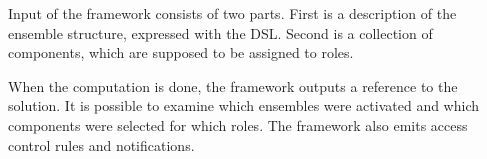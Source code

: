 \medskip

Input of the framework consists of two parts. First is a description of the ensemble
structure, expressed with the DSL. Second is a collection of components, which are
supposed to be assigned to roles.

\medskip

When the computation is done, the framework outputs a reference to the solution. It is
possible to examine which ensembles were activated and which components were selected
for which roles. The framework also emits access control rules and notifications.





